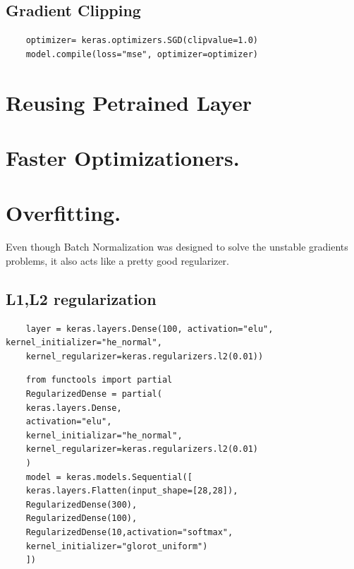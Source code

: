 \documentclass[12pt, a4paper]{book}
\begin{document}
\subsection*{Gradient Clipping}
\begin{verbatim}
	optimizer= keras.optimizers.SGD(clipvalue=1.0)
	model.compile(loss="mse", optimizer=optimizer)
\end{verbatim}

\section{Reusing Petrained Layer}

\section{Faster Optimizationers.}

\section{Overfitting.}
Even though Batch Normalization was designed to solve the unstable gradients problems, it also acts like a pretty good regularizer.
\subsection*{L1,L2 regularization}
\begin{verbatim}
	layer = keras.layers.Dense(100, activation="elu", kernel_initializer="he_normal",
	kernel_regularizer=keras.regularizers.l2(0.01))	
\end{verbatim}

\begin{verbatim}
	from functools import partial
	RegularizedDense = partial(
	keras.layers.Dense,
	activation="elu",
	kernel_initializar="he_normal",
	kernel_regularizer=keras.regularizers.l2(0.01)
	)
	model = keras.models.Sequential([
	keras.layers.Flatten(input_shape=[28,28]),
	RegularizedDense(300),
	RegularizedDense(100),
	RegularizedDense(10,activation="softmax",
	kernel_initializer="glorot_uniform")
	])
\end{verbatim}
\end{document}
